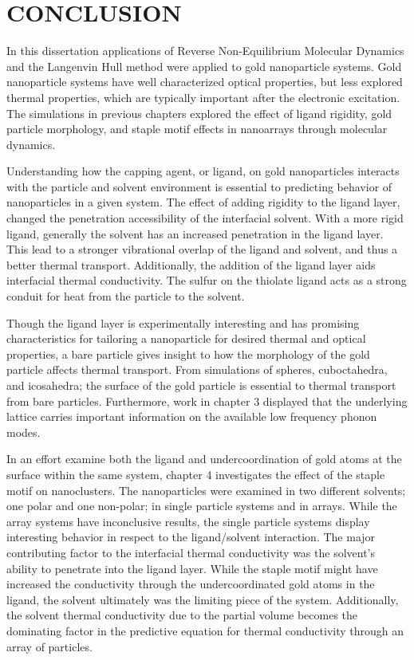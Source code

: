 \chapter{CONCLUSION}\label{chap:conclusion}
In this dissertation applications of Reverse Non-Equilibrium Molecular Dynamics and the Langenvin Hull method were applied to gold nanoparticle systems. Gold nanoparticle systems have well characterized optical properties, but less explored thermal properties, which are typically important after the electronic excitation. The simulations in previous chapters explored the effect of ligand rigidity, gold particle morphology, and staple motif effects in nanoarrays through molecular dynamics.

Understanding how the capping agent, or ligand, on gold nanoparticles interacts with the particle and solvent environment is essential to predicting behavior of nanoparticles in a given system. The effect of adding rigidity to the ligand layer, changed the penetration accessibility of the interfacial solvent. With a more rigid ligand, generally the solvent has an increased penetration in the ligand layer. This lead to a stronger vibrational overlap of the ligand and solvent, and thus a better thermal transport. Additionally, the addition of the ligand layer aids interfacial thermal conductivity. The sulfur on the thiolate ligand acts as a strong conduit for heat from the particle to the solvent.

Though the ligand layer is experimentally interesting and has promising characteristics for tailoring a nanoparticle for desired thermal and optical properties, a bare particle gives insight to how the morphology of the gold particle affects thermal transport.
From simulations of spheres, cuboctahedra, and icosahedra; the surface of the gold particle is essential to thermal transport from bare particles.
Furthermore, work in chapter 3 displayed that the underlying lattice carries important information on the available low frequency phonon modes. 

In an effort examine both the ligand and undercoordination of gold atoms at the surface within the same system, chapter 4 investigates the effect of the staple motif on  nanoclusters.
The nanoparticles were examined in two different solvents; one polar and one non-polar; in single particle systems and in arrays.
While the array systems have inconclusive results, the single particle systems display interesting behavior in respect to the ligand/solvent interaction. 
The major contributing factor to the interfacial thermal conductivity was the solvent's ability to penetrate into the ligand layer. While the staple motif might have increased the conductivity through the undercoordinated gold atoms in the ligand, the solvent ultimately was the limiting piece of the system. 
Additionally, the solvent thermal conductivity due to the partial volume becomes the dominating factor in the predictive equation for thermal conductivity through an array of  particles.

